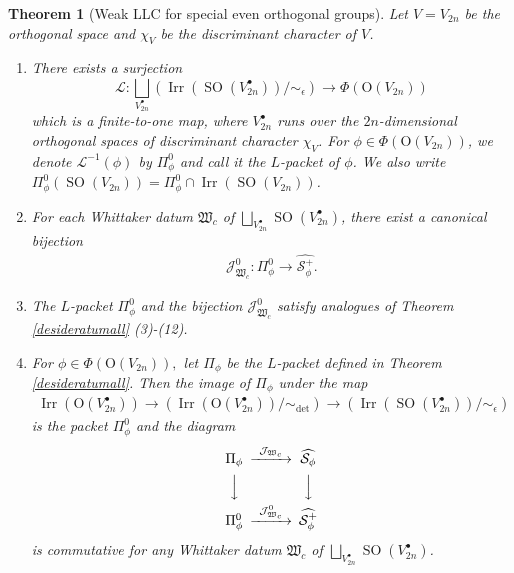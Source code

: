 \documentclass[article]{article}
\numberwithin{equation}{section}
\newtheorem{theorem}{Theorem}[section]
\theoremstyle{definition}
\DeclareMathOperator{\SO}{SO}
\DeclareMathOperator{\Irr}{Irr}
\begin{document}
\begin{theorem}[Weak LLC for special even orthogonal groups]\label{desideratumallspecial}
	Let $V=V_{2n}$ be the orthogonal space and $\chi_V$ be the discriminant character of $V$.
	\begin{enumerate}[(1).]
		\item There exists a surjection
		$$
		\mathcal L: \bigsqcup_{V_{2n}^{\bullet}} \left(\Irr \left(\SO(V_{2n}^\bullet)\right)/\sim_{\epsilon}\right) \longrightarrow \Phi(\mathrm O(V_{2n}))$$
		which is a finite-to-one map, where $V_{2n}^{\bullet}$ runs over the $2n$-dimensional orthogonal spaces of discriminant character $\chi_V$. For $\phi \in \Phi(\mathrm O(V_{2n}))$, we denote $\mathcal L^{-1}(\phi)$ by $\Pi^0_{\phi}$ and call it the $L$-packet of $\phi$. We also write $\Pi^0_{\phi}(\SO(V_{2n}))=\Pi^0_{\phi}\cap \Irr\left(\SO(V_{2n})\right)$.
		\item For each Whittaker datum $\mathfrak W_{c}$ of $\bigsqcup_{V_{2n}^{\bullet}}\SO(V_{2n}^{\bullet})$, there exist a canonical bijection
		\begin{align}\label{524}
		\mathcal J^0_{\mathfrak W_{c}} : \Pi^0_{\phi} \longrightarrow \widehat {\mathcal S^+_{\phi}}.
		\end{align}
		\item The $L$-packet $\Pi^0_{\phi}$ and the bijection $\mathcal J^0_{\mathfrak W_{c}}$ satisfy analogues of Theorem \ref{desideratumall} (3)-(12). 
		\item For $\phi\in \Phi(\mathrm O(V_{2n})),$ let $\Pi_{\phi}$ be the $L$-packet defined in Theorem \ref{desideratumall}. Then the image of $\Pi_{\phi}$ under the map 
		\begin{align*}
		\Irr(\mathrm O(V_{2n}^\bullet))\longrightarrow \left(\Irr(\mathrm O(V_{2n}^\bullet))/\sim_{\det} \right) \longrightarrow \left(\Irr(\SO(V_{2n}^\bullet))/\sim_{\epsilon}\right)
		\end{align*}
		is the packet $\Pi_{\phi}^0$ and the diagram 
		$$
		\begin{CD}
		\Pi_{\phi} @>\mathcal J_{\mathfrak W_c}>> \widehat{\mathcal {S}_{\phi}} \\
		@VVV  @VVV \\
		\Pi_{\phi}^0 @>\mathcal J^0_{\mathfrak W_{c}}>>  \widehat{\mathcal S^+_{\phi}}   
		\end{CD}
		$$
		is commutative for any Whittaker datum $\mathfrak W_{c}$ of $\bigsqcup_{V_{2n}^{\bullet}}\SO(V_{2n}^{\bullet})$.  
	\end{enumerate}
\end{theorem}
\end{document}
